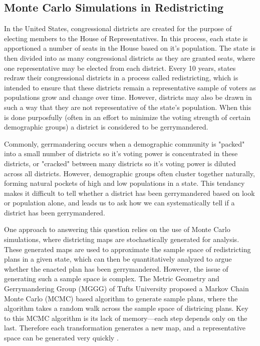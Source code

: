 \documentclass{article}
\begin{document}
\subsection{Monte Carlo Simulations in Redistricting}
\par 
In the United States, congressional districts are created for the purpose of electing members to the House of Representatives. In this process, each state is apportioned a number of seats in the House based on it's population. The state is then divided into as many congressional districts as they are granted seats, where one representative may be elected from each district. Every 10 years, states redraw their congressional districts in a process called redistricting, which is intended to ensure that these districts remain a representative sample of voters as populations grow and change over time. However, districts may also be drawn in such a way that they are not representative of the state's population. When this is done purposfully (often in an effort to minimize the voting strength of certain demographic groups) a district is considered to be gerrymandered.
\par
Commonly, gerrmandering occurs when a demographic community is "packed" into a small number of districts so it's voting power is concentrated in these districts, or "cracked" between many districts so it's voting power is diluted across all districts. However, demographic groups often cluster together naturally, forming natural pockets of high and low populations in a state. This tendancy makes it difficult to tell whether a district has been gerrymandered based on look or population alone, and leads us to ask how we can systematically tell if a district has been gerrymandered. 
\par
One approach to answering this question relies on the use of Monte Carlo simulations, where districting maps are stochastically generated for analysis. These generated maps are used to approximate the sample space of redistricting plans in a given state, which can then be quantitatively analyzed to argue whether the enacted plan has been gerrymandered. However, the issue of generating such a sample space is complex. The Metric Geometry and Gerrymandering Group (MGGG) of Tufts University proposed a Markov Chain Monte Carlo (MCMC) based algorithm to generate sample plans, where the algorithm takes a random walk across the sample space of districing plans. Key to this MCMC algorithm is its lack of memory—each step depends only on the last. Therefore each transformation generates a new map, and a representative space can be generated very quickly \cite{DBLP:journals/corr/abs-1911-05725}. 
\end{document}
